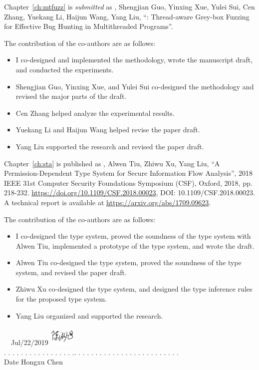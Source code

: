 \noindent Chapter~\ref{ch:mtfuzz} is \emph{submitted} as \myname, Shengjian Guo, Yinxing Xue, Yulei Sui, Cen Zhang, Yuekang Li, Haijun Wang, Yang Liu, ``\mtfuzz: Thread-aware Grey-box Fuzzing for Effective Bug Hunting in Multithreaded Programs''.

\noindent The contribution of the co-authors are as follows:
\begin{itemize}
	\item I co-designed and implemented the methodology, wrote the manuscript draft, and conducted the experiments.
	\item Shengjian Guo, Yinxing Xue, and Yulei Sui co-designed the methodology and revised the major parts of the draft.
	\item Cen Zhang helped analyze the experimental results.
	\item Yuekang Li and Haijun Wang helped revise the paper draft.
	\item Yang Liu supported the research and revised the paper draft.
\end{itemize}

\noindent Chapter~\ref{ch:sta} is published as \myname, Alwen Tiu, Zhiwu Xu, Yang Liu, ``A Permission-Dependent Type System for Secure Information Flow Analysis'', 2018 IEEE 31st Computer Security Foundations Symposium (CSF), Oxford, 2018, pp. 218-232. \url{https://doi.org/10.1109/CSF.2018.00023}, DOI: 10.1109/CSF.2018.00023. A technical report is available at \url{https://arxiv.org/abs/1709.09623}.

\noindent The contribution of the co-authors are as follows:
\begin{itemize}
	\item I co-designed the type system, proved the soundness of the type system with Alwen Tiu, implemented a prototype of the type system, and wrote the draft.
	\item Alwen Tiu co-designed the type system, proved the soundness of the type system, and revised the paper draft.
	\item Zhiwu Xu co-designed the type system, and designed the type inference rules for the proposed type system.
	\item Yang Liu organized and supported the research.
\end{itemize}

\vspace{150pt}

 \ \    
Jul/22/2019  \qquad \qquad \qquad \qquad\qquad\qquad \qquad \qquad \qquad \qquad
\includegraphics[width=0.09\textwidth]{res/sig_en.pdf}
\\
. . . . . . . . . . . . . . . . .\qquad \qquad \qquad \qquad\qquad \qquad . . . .  . . . . . . . . . . . . . . . . . . . . .\\
\indent \qquad Date \qquad \qquad \qquad  \qquad \qquad \qquad\qquad\qquad\qquad\qquad Hongxu Chen
